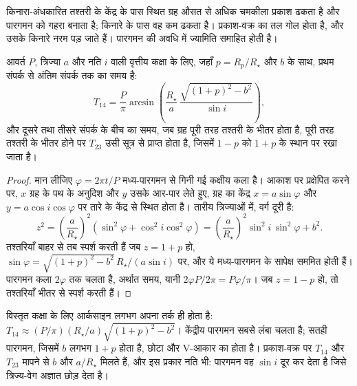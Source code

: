 किनारा-अंधकारित तश्तरी के केंद्र के पास स्थित ग्रह औसत से अधिक चमकीला प्रकाश ढकता है
और पारगमन को गहरा बनाता है; किनारे के पास वह कम ढकता है। प्रकाश-वक्र का तल गोल होता है,
और उसके किनारे नरम पड़ जाते हैं। पारगमन की अवधि
में ज्यामिति समाहित होती है।

\begin{theorem}\label{thm:b3:exoplanets:duration}
आवर्त $P$, त्रिज्या $a$ और नति $i$ वाली वृत्तीय कक्षा के लिए, जहाँ
$p = R_p/R_\star$ और  $b$ के साथ, प्रथम
संपर्क से अंतिम संपर्क तक का समय है:
\[
T_{14} = \frac{P}{\pi}\arcsin\!\left(\frac{R_\star}{a}\,
          \frac{\sqrt{(1 + p)^2 - b^2}}{\sin i}\right),
\]
और दूसरे तथा तीसरे संपर्क के बीच का समय, जब ग्रह पूरी तरह तश्तरी के भीतर होता है,
पूरी तरह तश्तरी के भीतर होने पर $T_{23}$ उसी सूत्र से प्राप्त होता है, जिसमें
$1 - p$ को $1 + p$ के स्थान पर रखा जाता है।
\end{theorem}

\begin{proof}
मान लीजिए $\varphi = 2\pi t/P$ मध्य-पारगमन से गिनी गई कक्षीय कला है।
आकाश पर प्रक्षेपित करने पर, $x$ ग्रह के पथ के अनुदिश और $y$ उसके आर-पार लेते हुए,
ग्रह का केंद्र $x = a\sin\varphi$ और $y = a\cos i\cos\varphi$ पर
तारे के केंद्र से स्थित होता है। तारीय त्रिज्याओं में, वर्ग दूरी है:
\[
z^2 = \left(\frac{a}{R_\star}\right)^2(\sin^2\varphi + \cos^2 i\cos^2\varphi)
    = \left(\frac{a}{R_\star}\right)^2\sin^2 i\,\sin^2\varphi + b^2 .
\]
तश्तरियाँ बाहर से तब स्पर्श करती हैं जब $z = 1 + p$ हो,
$\sin\varphi = \sqrt{(1 + p)^2 - b^2}\,R_\star/(a\sin i)$ पर, और ये
मध्य-पारगमन के सापेक्ष सममित होती हैं। पारगमन कला $2\varphi$ तक चलता है, अर्थात
समय, यानी $2\varphi P/2\pi = P\varphi/\pi$। जब $z = 1 - p$ हो, तो तश्तरियाँ
भीतर से स्पर्श करती हैं।
\end{proof}

विस्तृत कक्षा के लिए आर्कसाइन लगभग अपना तर्क ही होता है: $T_{14} \approx (P/\pi)
(R_\star/a)\sqrt{(1 + p)^2 - b^2}$। केंद्रीय पारगमन सबसे लंबा चलता है; सतही
पारगमन, जिसमें $b$ लगभग $1 + p$ होता है, छोटा और V-आकार का होता है।
प्रकाश-वक्र पर $T_{14}$ और $T_{23}$ मापने से $b$ और $a/R_\star$ मिलते हैं, और इस प्रकार
नति भी: पारगमन वह $\sin i$ दूर कर देता है
जिसे त्रिज्य-वेग अज्ञात छोड़ देता है।

